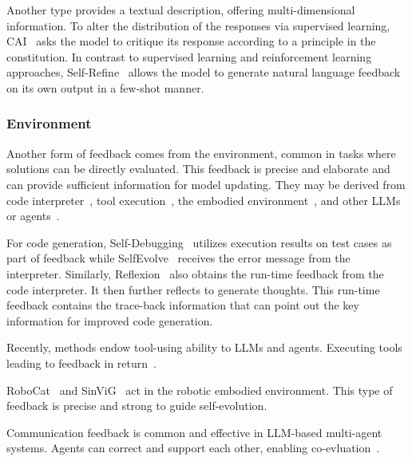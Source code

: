\documentclass[sn-basic, Numbered]{sn-jnl}%
\theoremstyle{thmstyleone}%
\theoremstyle{thmstyletwo}%
\theoremstyle{thmstylethree}%
\begin{document}
Another type provides a textual description, offering multi-dimensional information.
To alter the distribution of the responses via supervised learning, CAI~\cite{bai2022constitutional} asks the model to critique its response according to a principle in the constitution. 
In contrast to supervised learning and reinforcement learning approaches, Self-Refine~\cite{mad2023refine} allows the model to generate natural language feedback on its own output in a few-shot manner. 



\subsubsection{Environment} 
Another form of feedback comes from the environment, common in tasks where solutions can be directly evaluated. 
This feedback is precise and elaborate and can provide sufficient information for model updating.
They may be derived from code interpreter~\cite{jiang2023selfevolve, chen2023teaching, shinn2023reflexion}, tool execution~\cite{qiao2024autoact, gou2023critic}, the embodied environment~\cite{bousmalis2023robocat, xu2024sinvig, zhou2023isr}, and other LLMs or agents~\cite{wang2024sotopia, taubenfeld2024systematic, ulmer2024bootstrapping}.

For code generation, Self-Debugging~\citet{chen2023teaching} utilizes execution results on test cases as part of feedback while SelfEvolve~\cite{jiang2023selfevolve} receives the error message from the interpreter.
Similarly, Reflexion~\cite{shinn2023reflexion} also obtains the run-time feedback from the code interpreter. It then further reflects to generate thoughts.
This run-time feedback contains the trace-back information that can point out the key information for improved code generation.

Recently, methods endow tool-using ability to LLMs and agents. Executing tools leading to feedback in return~\cite{gou2023critic, qiao2024autoact, song2024trial, yang2024react, wang2024llms}.

RoboCat~\cite{bousmalis2023robocat} and SinViG~\cite{xu2024sinvig} act in the robotic embodied environment. This type of feedback is precise and strong to guide self-evolution.

Communication feedback is common and effective in LLM-based multi-agent systems. Agents can correct and support each other, enabling co-evluation~\cite{wang2024sotopia, taubenfeld2024systematic, ulmer2024bootstrapping}.


\end{document}
